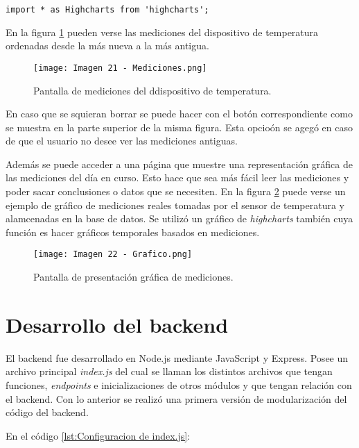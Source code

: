 \begin{lstlisting}[caption={Importación de gráfico de \textit{highcharts}}, label={lst:highcharts}]
import * as Highcharts from 'highcharts';
\end{lstlisting}

En la figura \ref{fig:21} pueden verse las mediciones del dispositivo de temperatura ordenadas desde la más nueva a la más antigua.

\begin{figure}[h]
\centering
\texttt{[image: Imagen 21 - Mediciones.png]}
\caption[Pantalla de mediciones del ddispositivo de temperatura]{Pantalla de mediciones del ddispositivo de temperatura. \footnotemark}
\label{fig:21}
\end{figure}

En caso que se squieran borrar se puede hacer con el botón correspondiente como se muestra en la parte superior de la misma figura. Esta opcioón se agegó en caso de que el usuario no desee ver las mediciones antiguas.

Además se puede acceder a una página que muestre una representación gráfica de las mediciones del día en curso. Esto hace que sea más fácil leer las mediciones y poder sacar conclusiones o datos que se necesiten. En la figura \ref{fig:22} puede verse un ejemplo de gráfico de mediciones reales tomadas por el sensor de temperatura y alamcenadas en la base de datos. Se utilizó un gráfico de \textit{highcharts} también cuya función es hacer gráficos temporales basados en mediciones.

\begin{figure}[h]
\centering
\texttt{[image: Imagen 22 - Grafico.png]}
\caption[Pantalla de presentación gráfica de mediciones]{Pantalla de presentación gráfica de mediciones. \footnotemark}
\label{fig:22}
\end{figure}

\section{Desarrollo del backend}

El backend fue desarrollado en Node.js mediante JavaScript y Express. Posee un archivo principal \textit{index.js} del cual se llaman los distintos archivos que tengan funciones, \textit{endpoints} e inicializaciones de otros módulos y que tengan relación con el backend. Con lo anterior se realizó una primera versión de modularización del código del backend.

En el código \ref{lst:Configuracion de index.js}:

